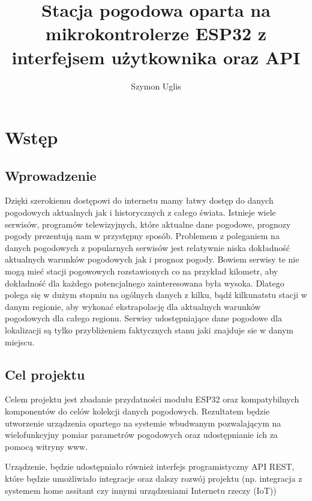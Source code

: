 \documentclass[12pt,a4paper]{article}
\title{Stacja pogodowa oparta na mikrokontrolerze ESP32 z interfejsem użytkownika oraz API}
\author{Szymon Uglis}
\begin{document}

\tableofcontents{}
\pagebreak

\section{Wstęp}

\subsection{Wprowadzenie}

Dzięki szerokiemu dostępowi do internetu mamy łatwy dostęp do danych pogodowych aktualnych jak i historycznych z całego świata. Istnieje wiele
serwisów, programów telewizyjnych, które aktualne dane pogodowe, prognozy pogody prezentują nam w przystępny sposób.
Problemem z poleganiem na danych pogodowych z popularnych serwisów jest relatywnie niska dokładność aktualnych warunków pogodowych jak i prognoz pogody.
Bowiem serwisy te nie mogą mieć stacji pogowowych rozstawionych co na przykład kilometr, aby dokładność dla każdego potencjalnego zainteresowana była wysoka.
Dlatego polega się w dużym stopniu na ogólnych danych z kilku, bądź kilkunatstu stacji w danym regionie, aby wykonać ekstrapolację dla
aktualnych warunków pogodowych dla całego regionu. 
Serwisy udostępniające dane pogodowe dla lokalizacji są tylko przybliżeniem faktycznych stanu jaki znajduje sie w danym miejscu. 

\subsection{Cel projektu}

Celem projektu jest zbadanie przydatności modułu ESP32 oraz kompatybilnych komponentów do celów kolekcji danych pogodowych. 
Rezultatem będzie utworzenie urządzenia opartego na systemie wbudwanym pozwalającym na wielofunkcyjny pomiar parametrów pogodowych oraz udostępnianie ich za pomocą witryny www.

Urządzenie, będzie udostępniało również interfejs programistyczny API REST, które będzie umożliwiało integracje oraz dalszy rozwój projektu 
(np. integracja z systemem home assitant czy innymi urządzeniami Internetu rzeczy (IoT))
\end{document}
